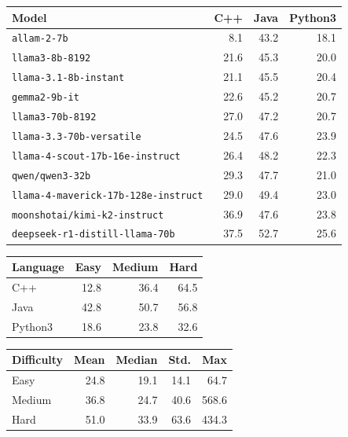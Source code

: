 \begin{tabular}{lrrr}
\hline\hline
\textbf{Model} & \textbf{C++} & \textbf{Java} & \textbf{Python3} \\
\hline
\texttt{allam-2-7b} & 8.1 & 43.2 & 18.1 \\
\texttt{llama3-8b-8192} & 21.6 & 45.3 & 20.0 \\
\texttt{llama-3.1-8b-instant} & 21.1 & 45.5 & 20.4 \\
\texttt{gemma2-9b-it} & 22.6 & 45.2 & 20.7 \\
\texttt{llama3-70b-8192} & 27.0 & 47.2 & 20.7 \\
\texttt{llama-3.3-70b-versatile} & 24.5 & 47.6 & 23.9 \\
\texttt{llama-4-scout-17b-16e-instruct} & 26.4 & 48.2 & 22.3 \\
\texttt{qwen/qwen3-32b} & 29.3 & 47.7 & 21.0 \\
\texttt{llama-4-maverick-17b-128e-instruct} & 29.0 & 49.4 & 23.0 \\
\texttt{moonshotai/kimi-k2-instruct} & 36.9 & 47.6 & 23.8 \\
\texttt{deepseek-r1-distill-llama-70b} & 37.5 & 52.7 & 25.6 \\
\hline\hline
\end{tabular}

\begin{tabular}{lrrr}
\hline\hline
\textbf{Language} & \textbf{Easy} & \textbf{Medium} & \textbf{Hard} \\
\hline
C++ & 12.8 & 36.4 & 64.5 \\
Java & 42.8 & 50.7 & 56.8 \\
Python3 & 18.6 & 23.8 & 32.6 \\
\hline\hline
\end{tabular}

\begin{tabular}{lrrrr}
\hline\hline
\textbf{Difficulty} & \textbf{Mean} & \textbf{Median} & \textbf{Std.} & \textbf{Max} \\
\hline
Easy & 24.8 & 19.1 & 14.1 & 64.7 \\
Medium & 36.8 & 24.7 & 40.6 & 568.6 \\
Hard & 51.0 & 33.9 & 63.6 & 434.3 \\
\hline\hline
\end{tabular}


